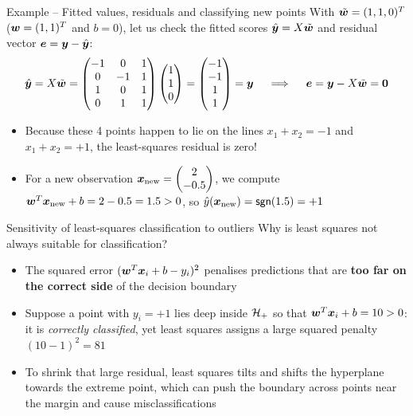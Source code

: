 \documentclass[aspectratio=169]{beamer}\usepackage[]{graphicx}\usepackage[]{xcolor}
\begin{document}
\begin{frame}{Example -- Fitted values, residuals and classifying new points}
    With $\tilde{\bm{w}} = (1, 1, 0)^T$ ($\bm{w} = (1, 1)^T$ and $b = 0$), let us check the fitted scores $\hat{\bm{y}} = X\tilde{\bm{w}}$ and residual vector $\bm{e} = \bm{y} - \hat{\bm{y}}$:
    \[
        \hat{\by} = X\tilde{\bw} = \begin{pmatrix} -1 & 0 & 1 \\ 0 & -1 & 1 \\ 1 & 0 & 1 \\ 0 & 1 & 1 \end{pmatrix} \begin{pmatrix} 1 \\ 1 \\ 0 \end{pmatrix} = \begin{pmatrix} -1 \\ -1 \\ 1 \\ 1 \end{pmatrix} = \by \quad \implies \quad \be = \by - X\tilde{\bw} = \b0
    \]
    \vfill
    \begin{itemize}
        \item Because these 4 points happen to lie on the lines $x_1 + x_2 = -1$ and $x_1 + x_2 = +1$, the least-squares residual is zero!
        \item For a new observation $\bm{x}_{\text{new}} = \begin{pmatrix} 2 \\ -0.5 \end{pmatrix}$, we compute $\bm{w}^T \bm{x}_{\text{new}} + b = 2 - 0.5 = 1.5 > 0$, so $\hat{y}(\bm{x}_{\text{new}}) = \mathsf{sgn}(1.5) = +1$
    \end{itemize}
\end{frame}


\begin{frame}{Sensitivity of least-squares classification to outliers}
    Why is least squares not always suitable for classification?
    \vfill
    \begin{itemize}
        \item The squared error $(\bm{w}^T \bm{x}_i + b - y_i)^2$ penalises predictions that are \textbf{too far on the correct side} of the decision boundary
        \vfill
        \item Suppose a point with $y_i = +1$ lies deep inside $\mathcal{H}_+$ so that $\bm{w}^T \bm{x}_i + b = 10 > 0$: it is \emph{correctly classified}, yet least squares assigns a large squared penalty $(10 - 1)^2 = 81$
        \vfill
        \item To shrink that large residual, least squares tilts and shifts the hyperplane towards the extreme point, which can push the boundary across points near the margin and cause misclassifications
    \end{itemize}
\end{frame}
\end{document}
